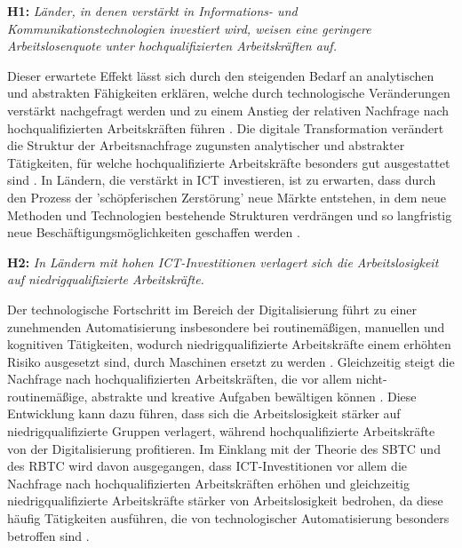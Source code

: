 \textbf{H1:} \textit{Länder, in denen verstärkt in Informations- und Kommunikationstechnologien 
investiert wird, weisen eine geringere Arbeitslosenquote unter hochqualifizierten Arbeitskräften 
auf.}

Dieser erwartete Effekt lässt sich durch den steigenden Bedarf an analytischen und abstrakten 
Fähigkeiten erklären, welche durch technologische Veränderungen verstärkt nachgefragt werden und 
zu einem Anstieg der relativen Nachfrage nach hochqualifizierten Arbeitskräften führen 
\parencite[vgl.][S. 1044–1045]{acemoglu2011skills}. Die digitale Transformation verändert die 
Struktur der Arbeitsnachfrage zugunsten analytischer und abstrakter Tätigkeiten, für welche 
hochqualifizierte Arbeitskräfte besonders gut ausgestattet sind 
\parencite[vgl.][S. 1071]{acemoglu2011skills}. In Ländern, die verstärkt in \ac{ICT} investieren, 
ist zu erwarten, dass durch den Prozess der 'schöpferischen Zerstörung' neue Märkte entstehen, in 
dem neue Methoden und Technologien bestehende Strukturen verdrängen und so langfristig neue 
Beschäftigungsmöglichkeiten geschaffen werden \parencite[vgl.][S. 83]{schumpeter1976capitalism}.

\textbf{H2:} \textit{In Ländern mit hohen \ac{ICT}-Investitionen verlagert sich die 
Arbeitslosigkeit auf niedrigqualifizierte Arbeitskräfte.}

Der technologische Fortschritt im Bereich der Digitalisierung führt zu einer zunehmenden 
Automatisierung insbesondere bei routinemäßigen, manuellen und kognitiven Tätigkeiten, wodurch 
niedrigqualifizierte Arbeitskräfte einem erhöhten Risiko ausgesetzt sind, durch Maschinen ersetzt 
zu werden \parencite[vgl.][S. 9–12]{autor2015whyare}. Gleichzeitig steigt die Nachfrage nach 
hochqualifizierten Arbeitskräften, die vor allem nicht-routinemäßige, abstrakte und kreative 
Aufgaben bewältigen können \parencite[vgl.][S. 12]{autor2015whyare}. Diese Entwicklung kann dazu 
führen, dass sich die Arbeitslosigkeit stärker auf niedrigqualifizierte Gruppen verlagert, 
während hochqualifizierte Arbeitskräfte von der Digitalisierung profitieren. Im Einklang mit der 
Theorie des \ac{SBTC} und des \ac{RBTC} wird davon ausgegangen, dass \ac{ICT}-Investitionen vor 
allem die Nachfrage nach hochqualifizierten Arbeitskräften erhöhen und gleichzeitig 
niedrigqualifizierte Arbeitskräfte stärker von Arbeitslosigkeit bedrohen, da diese häufig 
Tätigkeiten ausführen, die von technologischer Automatisierung besonders betroffen sind 
\parencite[vgl.][S. 1070–1072]{acemoglu2011skills}.

